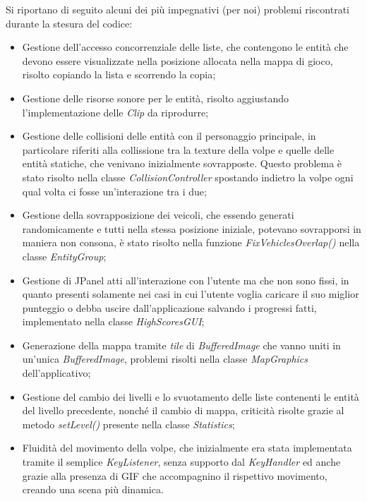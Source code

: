 \documentclass[12pt,a4paper]{report}
\begin{document}
Si riportano di seguito alcuni dei più impegnativi (per noi) problemi riscontrati durante la stesura del codice:
\begin{itemize}
\item Gestione dell'accesso concorrenziale delle liste, che contengono le entità che devono essere visualizzate nella posizione allocata nella mappa di gioco, risolto copiando la lista e scorrendo la copia;
\item Gestione delle risorse sonore per le entità, risolto aggiustando l'implementazione delle \emph{Clip} da riprodurre;
\item Gestione delle collisioni delle entità con il personaggio principale, in particolare riferiti alla collissione tra la texture della volpe e quelle delle entità statiche, che venivano inizialmente sovrapposte. Questo problema è stato risolto nella classe \emph{CollisionController} spostando indietro la volpe ogni qual volta ci fosse un'interazione tra i due;
\item Gestione della sovrapposizione dei veicoli, che essendo generati randomicamente e tutti nella stessa posizione iniziale, potevano sovrapporsi in maniera non consona, è stato risolto nella funzione \emph{FixVehiclesOverlap()} nella classe \emph{EntityGroup};
\item Gestione di JPanel atti all'interazione con l'utente ma che non sono fissi, in quanto presenti solamente nei casi in cui l'utente voglia caricare il suo miglior punteggio o debba uscire dall'applicazione salvando i progressi fatti, implementato nella classe \emph{HighScoresGUI};
\item Generazione della mappa tramite \emph{tile} di \emph{BufferedImage} che vanno uniti in un'unica \emph{BufferedImage}, problemi risolti nella classe \emph{MapGraphics} dell'applicativo;
\item Gestione del cambio dei livelli e lo svuotamento delle liste contenenti le entità del livello precedente, nonché il cambio di mappa, criticità risolte grazie al metodo \emph{setLevel()} presente nella classe \emph{Statistics};
\item Fluidità del movimento della volpe, che inizialmente era stata implementata tramite il semplice \emph{KeyListener}, senza supporto dal \emph{KeyHandler} ed anche grazie alla presenza di GIF che accompagnino il rispettivo movimento, creando una scena più dinamica.
\end{itemize}

\end{document}
